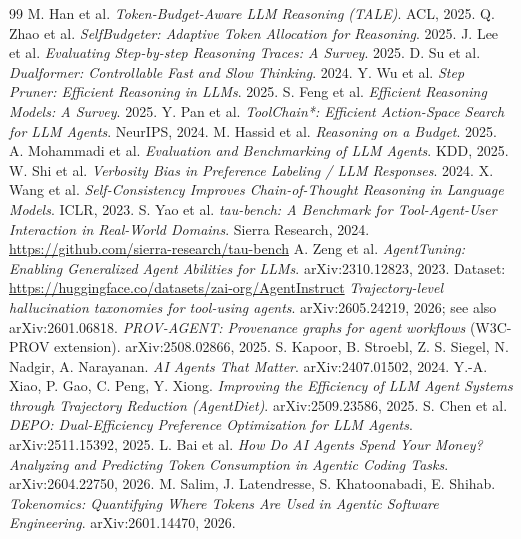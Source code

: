 \documentclass[11pt]{article}
\begin{document}
\begin{thebibliography}{99}
\small
{} M. Han et al. \emph{Token-Budget-Aware LLM Reasoning (TALE)}. ACL, 2025.
 Q. Zhao et al. \emph{SelfBudgeter: Adaptive Token Allocation for Reasoning}. 2025.
 J. Lee et al. \emph{Evaluating Step-by-step Reasoning Traces: A Survey}. 2025.
 D. Su et al. \emph{Dualformer: Controllable Fast and Slow Thinking}. 2024.
 Y. Wu et al. \emph{Step Pruner: Efficient Reasoning in LLMs}. 2025.
 S. Feng et al. \emph{Efficient Reasoning Models: A Survey}. 2025.
 Y. Pan et al. \emph{ToolChain*: Efficient Action-Space Search for LLM Agents}. NeurIPS, 2024.
 M. Hassid et al. \emph{Reasoning on a Budget}. 2025.
 A. Mohammadi et al. \emph{Evaluation and Benchmarking of LLM Agents}. KDD, 2025.
 W. Shi et al. \emph{Verbosity Bias in Preference Labeling / LLM Responses}. 2024.
 X. Wang et al. \emph{Self-Consistency Improves Chain-of-Thought Reasoning in Language Models}. ICLR, 2023.
 S. Yao et al. \emph{tau-bench: A Benchmark for Tool-Agent-User Interaction in Real-World Domains}. Sierra Research, 2024. \url{https://github.com/sierra-research/tau-bench}
 A. Zeng et al. \emph{AgentTuning: Enabling Generalized Agent Abilities for LLMs}. arXiv:2310.12823, 2023. Dataset: \url{https://huggingface.co/datasets/zai-org/AgentInstruct}
 \emph{Trajectory-level hallucination taxonomies for tool-using agents}. arXiv:2605.24219, 2026; see also arXiv:2601.06818.
 \emph{PROV-AGENT: Provenance graphs for agent workflows} (W3C-PROV extension). arXiv:2508.02866, 2025.
 S. Kapoor, B. Stroebl, Z. S. Siegel, N. Nadgir, A. Narayanan. \emph{AI Agents That Matter}. arXiv:2407.01502, 2024.
 Y.-A. Xiao, P. Gao, C. Peng, Y. Xiong. \emph{Improving the Efficiency of LLM Agent Systems through Trajectory Reduction (AgentDiet)}. arXiv:2509.23586, 2025.
 S. Chen et al. \emph{DEPO: Dual-Efficiency Preference Optimization for LLM Agents}. arXiv:2511.15392, 2025.
 L. Bai et al. \emph{How Do AI Agents Spend Your Money? Analyzing and Predicting Token Consumption in Agentic Coding Tasks}. arXiv:2604.22750, 2026.
 M. Salim, J. Latendresse, S. Khatoonabadi, E. Shihab. \emph{Tokenomics: Quantifying Where Tokens Are Used in Agentic Software Engineering}. arXiv:2601.14470, 2026.
\end{thebibliography}
\end{document}

